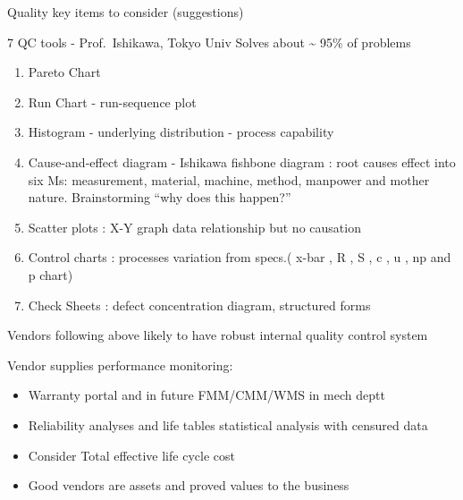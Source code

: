\documentclass[
  10pt,
  ignorenonframetext,
  aspectratio=43,
]{beamer}
\providecommand{\tightlist}{%
  \setlength{\itemsep}{0pt}\setlength{\parskip}{0pt}}
\begin{document}
\begin{frame}{Quality key items to consider (suggestions)}
\protect\hypertarget{quality-key-items-to-consider-suggestions}{}
\begin{block}{7 QC tools - Prof.~Ishikawa, Tokyo Univ}
\protect\hypertarget{qc-tools---prof.-ishikawa-tokyo-univ}{}
Solves about \textasciitilde{} 95\% of problems

\begin{enumerate}
\tightlist
\item
  Pareto Chart
\item
  Run Chart - run-sequence plot
\item
  Histogram - underlying distribution - process capability
\item
  Cause-and-effect diagram - Ishikawa fishbone diagram : root causes
  effect into six Ms: measurement, material, machine, method, manpower
  and mother nature. Brainstorming ``why does this happen?''
\item
  Scatter plots : X-Y graph data relationship but no causation
\item
  Control charts : processes variation from specs.( x-bar , R , S , c ,
  u , np and p chart)
\item
  Check Sheets : defect concentration diagram, structured forms
\end{enumerate}

Vendors following above likely to have robust internal quality control
system
\end{block}
\end{frame}

\begin{frame}
\begin{block}{Vendor supplies performance monitoring:}
\protect\hypertarget{vendor-supplies-performance-monitoring}{}
\begin{itemize}
\tightlist
\item
  Warranty portal and in future FMM/CMM/WMS in mech deptt
\item
  Reliability analyses and life tables statistical analysis with
  censured data
\item
  Consider Total effective life cycle cost
\item
  Good vendors are assets and proved values to the business
\end{itemize}
\end{block}
\end{frame}
\end{document}
